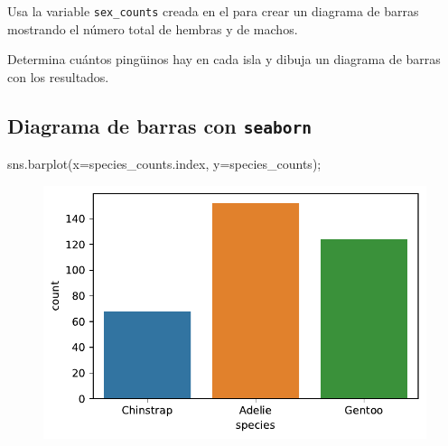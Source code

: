 \documentclass[
  a4paper,
  noprof,
  12pt,
  notoc,
  nosols,
  nobib]{mnye}
\newenvironment{Shaded}{\begin{snugshade}}{\end{snugshade}}
\newcommand{\NormalTok}[1]{\textcolor[rgb]{0.00,0.23,0.31}{#1}}
\newcommand{\OperatorTok}[1]{\textcolor[rgb]{0.37,0.37,0.37}{#1}}
\renewenvironment{exercise}[1][]{
            \if\relax\detokenize{#1}\relax
                \ex
            \else
                \ex[note={#1}]
            \fi
        }{\endex}
\theoremstyle{definition}
\newtheorem{exercise}{Ejercicio}[section]
\theoremstyle{remark}
\begin{document}
\begin{exercise}[]%
\protect\hypertarget{exr-1categorial-pd-sex-bar}{}\label{exr-1categorial-pd-sex-bar}%
Usa la variable \texttt{sex\_counts} creada en el
 para crear un diagrama de
barras mostrando el número total de hembras y de machos.

\end{exercise}

\begin{exercise}[]%
\protect\hypertarget{exr-1categorial-pd-island}{}\label{exr-1categorial-pd-island}%
Determina cuántos pingüinos hay en cada isla y dibuja un diagrama de
barras con los resultados.

\end{exercise}

\hypertarget{diagrama-de-barras-con-seaborn}{%
\subsection{\texorpdfstring{Diagrama de barras con
\texttt{seaborn}}{Diagrama de barras con seaborn}}\label{diagrama-de-barras-con-seaborn}}

\begin{Shaded}
\begin{Highlighting}[]
\NormalTok{sns.barplot(x}\OperatorTok{=}\NormalTok{species\_counts.index, y}\OperatorTok{=}\NormalTok{species\_counts)}\OperatorTok{;}
\end{Highlighting}
\end{Shaded}

\begin{figure}[tbph]

{\centering \includegraphics{chapters/1categorical_files/figure-pdf/cell-12-output-1.pdf}

}

\end{figure}
\end{document}
